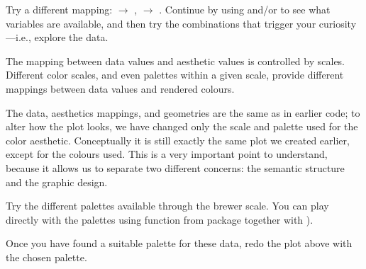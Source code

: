 \documentclass[krantz2]{krantz}\usepackage{knitr}
\begin{document}
\begin{playground}
Try a different mapping:  $\rightarrow$ ,  $\rightarrow$ . Continue by using  and/or  to see what variables are available, and then try the combinations that trigger your curiosity---i.e., explore the data.
\end{playground}

The mapping between data values and aesthetic values is controlled by scales. Different color scales, and even palettes within a given scale, provide different mappings between data values and rendered colours.

\begin{knitrout}\footnotesize
{}\color{fgcolor}\begin{kframe}
\begin{alltt}
\hlstd{(} 
       \hlstd{(}     \hlstd{=}  \hlopt{+}
  \hlstd{()} \hlopt{+}
  \hlstd{(} \hlstd{=} \hlstd{,}  \hlstd{=} \hlstd{)}
\end{alltt}
\end{kframe}
\end{knitrout}

The data, aesthetics mappings, and geometries are the same as in earlier code; to alter how the plot looks, we have changed only the scale and palette used for the color aesthetic. Conceptually it is still exactly the same plot we created earlier, except for the colours used. This is a very important point to understand, because it allows us to separate two different concerns: the semantic structure and the graphic design.

\begin{playground}
Try the different palettes available through the brewer scale. You can play directly with the palettes using function  from package  together with ).

\begin{knitrout}\footnotesize
{}\color{fgcolor}\begin{kframe}
\begin{alltt}
\hlstd{(}\hlstd{()(}\hlstd{))}
\hlstd{(}\hlstd{(} \hlstd{=} \hlstd{,}  \hlstd{=} \hlstd{,}  \hlstd{=} \hlstd{)(}\hlstd{))}
\end{alltt}
\end{kframe}
\end{knitrout}
Once you have found a suitable palette for these data, redo the plot above with the chosen palette.
\end{playground}
\end{document}

